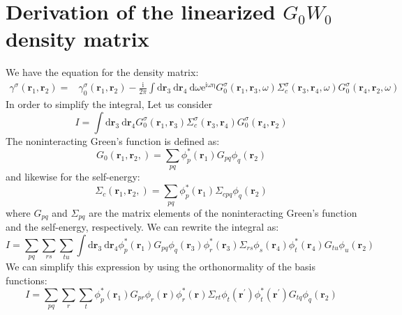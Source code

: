 \documentclass[12pt]{caltech_thesis}
\begin{document}
\chapter{Derivation of the linearized $G_0W_0$ density matrix}
\label{app:linearized_gw}
We have the equation for the density matrix:
\begin{equation}
\begin{aligned}
\gamma^\sigma\left(\mathbf{r}_1, \mathbf{r}_2\right)= & \gamma_0^\sigma\left(\mathbf{r}_1, \mathbf{r}_2\right) -\frac{\mathrm{i}}{2 \pi} \int \mathrm{d} \mathbf{r}_3 \mathrm{~d} \mathbf{r}_4 \mathrm{~d} \omega \mathrm{e}^{\mathrm{i \omega \eta}} G_0^\sigma\left(\mathbf{r}_1, \mathbf{r}_3, \omega\right) \Sigma_c^\sigma\left(\mathbf{r}_3, \mathbf{r}_4, \omega\right) G_0^\sigma\left(\mathbf{r}_4, \mathbf{r}_2, \omega\right)
\label{eqn:init_dm}
\end{aligned}
\end{equation}
In order to simplify the integral, Let us consider
\begin{equation}
I = \int \mathrm{d} \mathbf{r}_3 \mathrm{~d} \mathbf{r}_4  G_0^\sigma\left(\mathbf{r}_1, \mathbf{r}_3\right) \Sigma_c^\sigma\left(\mathbf{r}_3, \mathbf{r}_4\right) G_0^\sigma\left(\mathbf{r}_4, \mathbf{r}_2\right)
\end{equation}
The noninteracting Green's function is defined as:
\begin{equation}
G_0\left(\mathbf{r}_1, \mathbf{r}_2, \right) = \sum_{pq} \phi_p^*(\mathbf{r}_1) G_{p q} \phi_q(\mathbf{r}_2)
\end{equation}
and likewise for the self-energy:
\begin{equation}
\Sigma_c\left(\mathbf{r}_1, \mathbf{r}_2, \right) = \sum_{pq} \phi_p^*(\mathbf{r}_1) \Sigma_{c pq} \phi_q(\mathbf{r}_2)
\end{equation}
where $G_{p q}$ and $\Sigma_{p q}$ are the matrix elements of the noninteracting Green's function and the self-energy, respectively. We can rewrite the integral as:
\begin{equation}
I = \sum_{pq} \sum_{rs} \sum_{tu} \int \mathrm{d} \mathbf{r}_3 \mathrm{~d} \mathbf{r}_4 \phi_p^*(\mathbf{r}_1) G_{p q} \phi_q(\mathbf{r}_3) \phi_r^*(\mathbf{r}_3) \Sigma_{r s} \phi_s(\mathbf{r}_4) \phi_t^*(\mathbf{r}_4) G_{t u} \phi_u(\mathbf{r}_2)
\end{equation}
We can simplify this expression by using the orthonormality of the basis functions:
\begin{equation}
I = \sum_{pq} \sum_{r} \sum_{t} \phi_p^*(\mathbf{r}_1) G_{p r} \phi_r(\mathbf{r}) \phi_r^*(\mathbf{r}) \Sigma_{r t} \phi_t(\mathbf{r}^\prime) \phi_t^*(\mathbf{r}^\prime) G_{t q} \phi_q(\mathbf{r}_2)
\end{equation}
\end{document}
